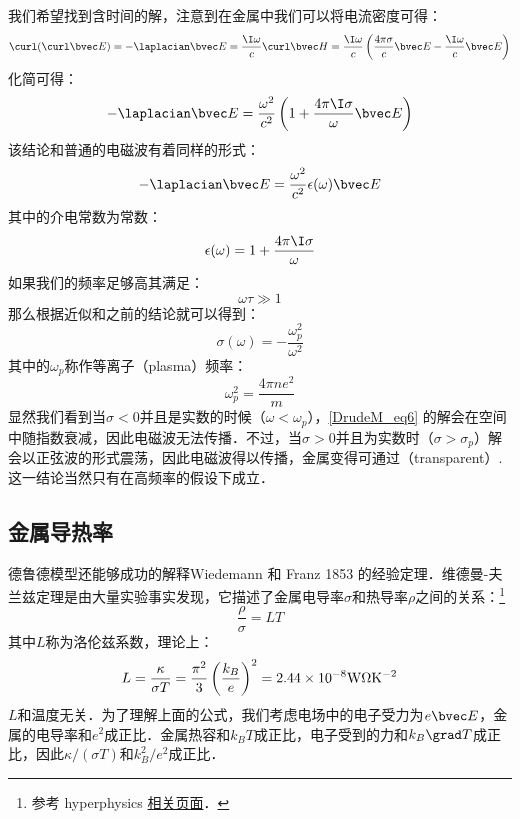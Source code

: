 我们希望找到含时间的解，注意到在金属中我们可以将电流密度可得：
\begin{equation}
\curl(\curl\bvec E)=-\laplacian \bvec E =\frac{\I\omega}{c}\curl\bvec H=\frac{\I\omega}{c}\left(\frac{4\pi\sigma}{c}\bvec E-\frac{\I\omega}{c}\bvec E\right)
\end{equation}
化简可得：
\begin{equation}
-\laplacian \bvec E =\frac{\omega^2}{c^2}\left(1+\frac{4\pi\I\sigma}{\omega}\bvec E\right)
\end{equation}
该结论和普通的电磁波有着同样的形式：
\begin{equation}\label{DrudeM_eq6}
-\laplacian \bvec E = \frac{\omega^2}{c^2}\epsilon(\omega)\bvec E
\end{equation}
其中的介电常数为常数：
\begin{equation}
\epsilon(\omega)=1+\frac{4\pi\I\sigma}{\omega}
\end{equation}
如果我们的频率足够高其满足：
\begin{equation}
\omega\tau\gg 1
\end{equation}
那么根据近似和之前的结论就可以得到：
\begin{equation}
\sigma(\omega)=-\frac{\omega_p^2}{\omega^2}
\end{equation}
其中的$\omega_p$称作等离子（plasma）频率：
\begin{equation}
\omega_p^2=\frac{4\pi ne^2}{m}
\end{equation}
显然我们看到当$\sigma<0$并且是实数的时候（$\omega<\omega_p$），\autoref{DrudeM_eq6} 的解会在空间中随指数衰减，因此电磁波无法传播．不过，当$\sigma>0$并且为实数时（$\sigma>\sigma_p$）解会以正弦波的形式震荡，因此电磁波得以传播，金属变得可通过（transparent）.这一结论当然只有在高频率的假设下成立．

\subsection{金属导热率}
德鲁德模型还能够成功的解释Wiedemann 和 Franz 1853 的经验定理．维德曼-夫兰兹定理是由大量实验事实发现，它描述了金属电导率$\sigma$和热导率$\rho$之间的关系：\footnote{参考 hyperphysics \href{http://hyperphysics.phy-astr.gsu.edu/hbase/thermo/thercond.html}{相关页面}．}
\begin{equation}
\frac{\rho}{\sigma}=LT
\end{equation}
其中$L$称为洛伦兹系数，理论上：
\begin{equation}
L=\frac{\kappa}{\sigma T}=\frac{\pi^2}{3}\left(\frac{k_B}{e}\right)^2 = 2.44\times10^{-8}\rm{W\Omega K^{-2}}
\end{equation}
$L$和温度无关．为了理解上面的公式，我们考虑电场中的电子受力为$e\bvec E$，金属的电导率和$e^2$成正比．金属热容和$k_B T$成正比，电子受到的力和$k_B\grad T$成正比，因此$\kappa/(\sigma T)$和$k_B^2/e^2$成正比．

